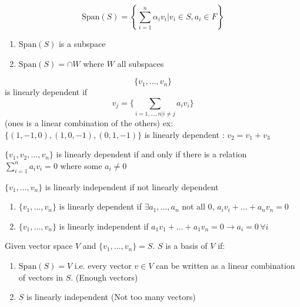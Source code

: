 \begin{definition} 
	\[\mathrm{Span}(S) = \left\{\sum^n_{i=1}\alpha_iv_i | v_i \in S, a_i\in F\right\}\]
\end{definition}

\begin{proposition} 

\begin{enumerate} 
	\item $\mathrm{Span}(S)$ is a subspace
	\item $\mathrm{Span}(S) = \cap W$ where $W$ all subspaces
\end{enumerate}	
\end{proposition}

\begin{definition} 
	\[\{v_1,\hdots,v_n\}\] is linearly dependent if
	\[v_j=\{\sum_{i=1,\hdots,n | i\neq j}a_iv_i\}\]
	(ones is a linear combination of the others)
	ex: $\{(1,-1,0),(1,0,-1),(0,1,-1)\}$ is linearly dependent : $v_2 = v_1 + v_3$
\end{definition}

\begin{lemma} 
	$\{v_1,v_2,\hdots,v_n\}$ is linearly dependent if and only if there is a relation $\sum_{i=1}^n a_iv_i =0$ where some $a_i \neq 0$
\end{lemma}

\begin{definition} 
	$\{v_1,\hdots,v_n\}$ is linearly independent if not  linearly dependent
\end{definition}

\begin{lemma} 
	\begin{enumerate} 
		\item $\{v_1,\hdots,v_n\}$ is linearly dependent if $\exists a_1,\hdots,a_n$ not all 0, $a_iv_i + \hdots + a_nv_n=0$
		\item $\{v_1,\hdots,v_n\}$ is linearly independent if $a_1v_1+\hdots+a_1v_n=0 \rightarrow a_i=0 \,\forall i$
	\end{enumerate}
\end{lemma}


\begin{definition} 
	Given vector space $V$ and $\{v_1,\hdots,v_n\} = S$. $S$ is a basis of $V$ if:
	\begin{enumerate} 
		\item $\mathrm{Span}(S)	=V$ i.e. every vector $v\in V$ can be written as a linear combination of vectors in $S$. (Enough vectors)
		\item $S$ is linearly independent (Not too many vectors)
	\end{enumerate}
\end{definition}

